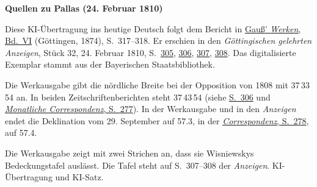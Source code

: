 \clearpage\thispagestyle{empty}
\begin{center}\textbf{Quellen zu Pallas (24. Februar 1810)}\end{center}
\noindent Diese KI-Übertragung ins heutige Deutsch folgt dem Bericht in \href{https://gdz.sub.uni-goettingen.de/id/PPN236007467}{Gauß’ \textit{Werken}, Bd.~VI} (Göttingen, 1874), S.~317--318. Er erschien in den \textit{Göttingischen gelehrten Anzeigen}, Stück 32, 24. Februar 1810, S.~\href{https://api.digitale-sammlungen.de/iiif/image/v2/bsb10538677_00341/full/1600,/0/default.jpg}{305}, \href{https://api.digitale-sammlungen.de/iiif/image/v2/bsb10538677_00342/full/1600,/0/default.jpg}{306}, \href{https://api.digitale-sammlungen.de/iiif/image/v2/bsb10538677_00343/full/1600,/0/default.jpg}{307}, \href{https://api.digitale-sammlungen.de/iiif/image/v2/bsb10538677_00344/full/1600,/0/default.jpg}{308}. Das digitalisierte Exemplar stammt aus der Bayerischen Staatsbibliothek.
\par\smallskip\noindent Die Werkausgabe gibt die nördliche Breite bei der Opposition von 1808 mit 37\,33\,54 an. In beiden Zeitschriftenberichten steht 37\,43\,54 (siehe \href{https://api.digitale-sammlungen.de/iiif/image/v2/bsb10538677_00342/full/1600,/0/default.jpg}{S.~306} und \href{https://api.digitale-sammlungen.de/iiif/image/v2/bsb10538611_00285/full/1600,/0/default.jpg}{\textit{Monatliche Correspondenz}, S.~277}). In der Werkausgabe und in den \textit{Anzeigen} endet die Deklination vom 29. September auf 57.3, in der \href{https://api.digitale-sammlungen.de/iiif/image/v2/bsb10538611_00286/full/1600,/0/default.jpg}{\textit{Correspondenz}, S.~278}, auf 57.4.
\par\smallskip\noindent Die Werkausgabe zeigt mit zwei Strichen an, dass sie Wisniewskys Bedeckungstafel auslässt. Die Tafel steht auf S.~307--308 der \textit{Anzeigen}. KI-Übertragung und KI-Satz.
\clearpage
